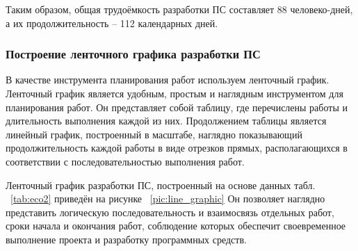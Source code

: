 







Таким образом, общая трудоёмкость разработки ПС составляет  88 человеко-дней, а их продолжительность – 112 календарных дней.

\subsubsection*{Построение ленточного графика разработки ПС}
В качестве инструмента планирования работ используем ленточный график. Ленточный график является удобным, простым и наглядным
инструментом для планирования работ. Он представляет собой таблицу, где перечислены  работы и длительность выполнения каждой
из них. Продолжением таблицы является линейный график, построенный в масштабе, наглядно показывающий продолжительность
каждой работы в виде отрезков прямых,  располагающихся в соответствии с последовательностью выполнения работ.

Ленточный график разработки ПС, построенный на основе данных табл. ~\ref{tab:eco2} приведён на рисунке ~\ref{pic:line_graphic} 
Он позволяет наглядно представить логическую последовательность и взаимосвязь отдельных работ, сроки начала и окончания работ,
соблюдение которых обеспечит своевременное выполнение проекта и разработку программных средств.

